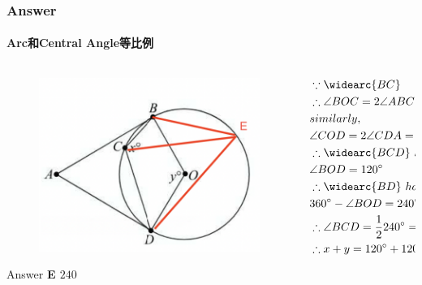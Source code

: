 \documentclass[
	11pt, %
]{beamer}
\begin{document}
\begin{frame}
	\frametitle{Answer}
	\framesubtitle{Arc和Central Angle等比例}
	\pause
	\begin{columns}[t] 
		\begin{column}{0.4\textwidth} %
			\begin{figure}
				\includegraphics[width=\linewidth]{Chord_Angle_Tangent_Example_Question1_1.png}
			\end{figure}
			\pause
			Answer \textbf{E $240$}
		\end{column}
		\begin{column}{0.6\textwidth} %
			\pause
	     \begin{equation*}
					\begin{aligned}
					&\because \widearc{BC}\\
					&\therefore \angle BOC = 2 \angle ABC = \ang{40}\\
					&similarly, \\
					&\angle COD = 2 \angle CDA =\ang{80}\\
					& \therefore \widearc{BCD}\ has\ central \ angle \\
					&\angle BOD = \ang{120}\\
					&\therefore \widearc{BD}\ has\ central \ angle \\
					&\ang{360} - \angle BOD =\ang{240}\\
					&\therefore \angle BCD = \frac{1}{2} \ang{240}=\ang{120}\\
					&\therefore x + y = \ang{120} + \ang{120} = \ang{240} 
					\end{aligned}
				\end{equation*}	
		\end{column}
	\end{columns}
			
\end{frame}
\end{document}
